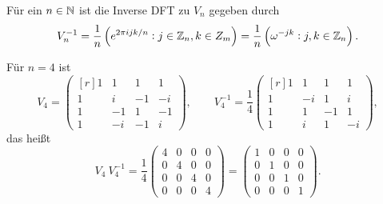\begin{proposition}
Für ein $ n \in \mathbb{N} $ ist die Inverse DFT zu $ V_{n} $ gegeben durch
\[
    V_{n}^{-1}
  = \frac{1}{n} \left( e^{2\pi i j k / n} : j \in \mathbb{Z}_{n}, k \in Z_{m} \right)
  = \frac{1}{n} \left( \omega^{-jk} : j,k \in \mathbb{Z}_{n} \right).
\]
\end{proposition}

\begin{example}
Für $ n = 4 $ ist
\[
    V_{4}
  = \begin{pmatrix*}[r]
      1 &  1 &  1 &  1 \\
      1 &  i & -1 & -i \\
      1 & -1 &  1 & -1 \\
      1 & -i & -1 & i
    \end{pmatrix*}, \qquad
    V_{4}^{-1}
  = \frac{1}{4} \begin{pmatrix*}[r]
      1 &  1 &  1 &  1 \\
      1 & -i &  1 &  i \\
      1 &  1 & -1 &  1 \\
      1 &  i &  1 & -i
    \end{pmatrix*},
\]
das heißt
\[
    V_{4} \ V_{4}^{-1}
  = \frac{1}{4} \begin{pmatrix}
      4 & 0 & 0 & 0 \\
      0 & 4 & 0 & 0 \\
      0 & 0 & 4 & 0 \\
      0 & 0 & 0 & 4
    \end{pmatrix}
  = \begin{pmatrix}
      1 & 0 & 0 & 0 \\
      0 & 1 & 0 & 0 \\
      0 & 0 & 1 & 0 \\
      0 & 0 & 0 & 1
      \end{pmatrix}.
\]
\end{example}

